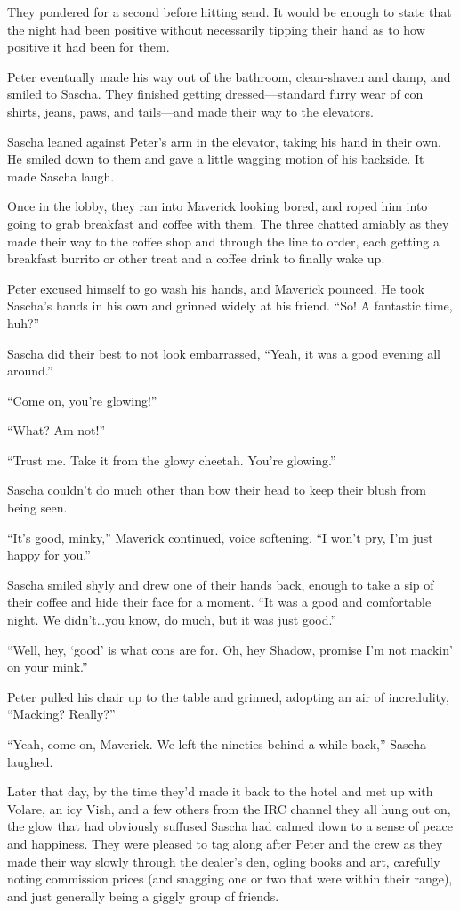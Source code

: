 They pondered for a second before hitting send. It would be enough to state that the night had been positive without necessarily tipping their hand as to how positive it had been for them.

Peter eventually made his way out of the bathroom, clean-shaven and damp, and smiled to Sascha. They finished getting dressed---standard furry wear of con shirts, jeans, paws, and tails---and made their way to the elevators.

Sascha leaned against Peter's arm in the elevator, taking his hand in their own. He smiled down to them and gave a little wagging motion of his backside. It made Sascha laugh.

Once in the lobby, they ran into Maverick looking bored, and roped him into going to grab breakfast and coffee with them. The three chatted amiably as they made their way to the coffee shop and through the line to order, each getting a breakfast burrito or other treat and a coffee drink to finally wake up.

Peter excused himself to go wash his hands, and Maverick pounced. He took Sascha's hands in his own and grinned widely at his friend. ``So! A fantastic time, huh?''

Sascha did their best to not look embarrassed, ``Yeah, it was a good evening all around.''

``Come on, you're glowing!''

``What? Am not!''

``Trust me. Take it from the glowy cheetah. You're glowing.''

Sascha couldn't do much other than bow their head to keep their blush from being seen.

``It's good, minky,'' Maverick continued, voice softening. ``I won't pry, I'm just happy for you.''

Sascha smiled shyly and drew one of their hands back, enough to take a sip of their coffee and hide their face for a moment. ``It was a good and comfortable night. We didn't\ldots{}you know, do much, but it was just good.''

``Well, hey, `good' is what cons are for. Oh, hey Shadow, promise I'm not mackin' on your mink.''

Peter pulled his chair up to the table and grinned, adopting an air of incredulity, ``Macking? Really?''

``Yeah, come on, Maverick. We left the nineties behind a while back,'' Sascha laughed.

Later that day, by the time they'd made it back to the hotel and met up with Volare, an icy Vish, and a few others from the IRC channel they all hung out on, the glow that had obviously suffused Sascha had calmed down to a sense of peace and happiness. They were pleased to tag along after Peter and the crew as they made their way slowly through the dealer's den, ogling books and art, carefully noting commission prices (and snagging one or two that were within their range), and just generally being a giggly group of friends.


